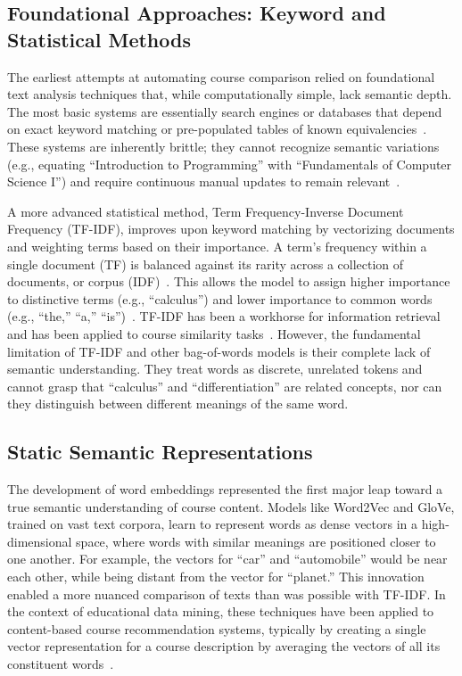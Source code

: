\begin{introduction}
    \subsection{Foundational Approaches: Keyword and Statistical Methods}
    The earliest attempts at automating course comparison relied on foundational text analysis techniques that, while computationally simple, lack semantic depth. The most basic systems are essentially search engines or databases that depend on exact keyword matching or pre-populated tables of known equivalencies~\cite{shamrock}. These systems are inherently brittle; they cannot recognize semantic variations (e.g., equating ``Introduction to Programming'' with ``Fundamentals of Computer Science I'') and require continuous manual updates to remain relevant~\cite{shiferaw2024}.

    A more advanced statistical method, Term Frequency-Inverse Document Frequency (TF-IDF), improves upon keyword matching by vectorizing documents and weighting terms based on their importance. A term's frequency within a single document (TF) is balanced against its rarity across a collection of documents, or corpus (IDF)~\cite{AIZAWA200345}. This allows the model to assign higher importance to distinctive terms (e.g., ``calculus'') and lower importance to common words (e.g., ``the,'' ``a,'' ``is'')~\cite{AIZAWA200345}. TF-IDF has been a workhorse for information retrieval and has been applied to course similarity tasks~\cite{AIZAWA200345}. However, the fundamental limitation of TF-IDF and other bag-of-words models is their complete lack of semantic understanding. They treat words as discrete, unrelated tokens and cannot grasp that ``calculus'' and ``differentiation'' are related concepts, nor can they distinguish between different meanings of the same word.

    \subsection{Static Semantic Representations}
    The development of word embeddings represented the first major leap toward a true semantic understanding of course content. Models like Word2Vec and GloVe, trained on vast text corpora, learn to represent words as dense vectors in a high-dimensional space, where words with similar meanings are positioned closer to one another. For example, the vectors for ``car'' and ``automobile'' would be near each other, while being distant from the vector for ``planet.'' This innovation enabled a more nuanced comparison of texts than was possible with TF-IDF. In the context of educational data mining, these techniques have been applied to content-based course recommendation systems, typically by creating a single vector representation for a course description by averaging the vectors of all its constituent words~\cite{pardos10.1145/3330430.3333622}.


\end{introduction}

